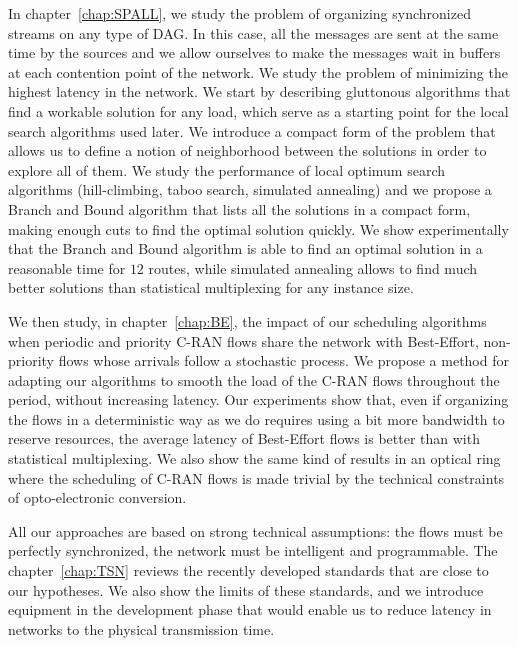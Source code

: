 In chapter~\ref{chap:SPALL}, we study the problem of organizing synchronized streams on any type of DAG. In this case, all the messages are sent at the same time by the sources and we allow ourselves to make the messages wait in buffers at each contention point of the network. We study the problem of minimizing the highest latency in the network. We start by describing gluttonous algorithms that find a workable solution for any load, which serve as a starting point for the local search algorithms used later. We introduce a compact form of the problem that allows us to define a notion of neighborhood between the solutions in order to explore all of them. We study the performance of local optimum search algorithms (hill-climbing, taboo search, simulated annealing) and we propose a Branch and Bound algorithm that lists all the solutions in a compact form, making enough cuts to find the optimal solution quickly. We show experimentally that the Branch and Bound algorithm is able to find an optimal solution in a reasonable time for $12$ routes, while simulated annealing allows to find much better solutions than statistical multiplexing for any instance size.

We then study, in chapter~\ref{chap:BE}, the impact of our scheduling algorithms when periodic and priority C-RAN flows share the network with Best-Effort, non-priority flows whose arrivals follow a stochastic process. We propose a method for adapting our algorithms to smooth the load of the C-RAN flows throughout the period, without increasing latency. Our experiments show that, even if organizing the flows in a deterministic way as we do requires using a bit more bandwidth to reserve resources, the average latency of Best-Effort flows is better than with statistical multiplexing. We also show the same kind of results in an optical ring where the scheduling of C-RAN flows is made trivial by the technical constraints of opto-electronic conversion.

All our approaches are based on strong technical assumptions: the flows must be perfectly synchronized, the network must be intelligent and programmable. The chapter~\ref{chap:TSN} reviews the recently developed standards that are close to our hypotheses. We also show the limits of these standards, and we introduce equipment in the development phase that would enable us to reduce latency in networks to the physical transmission time.
